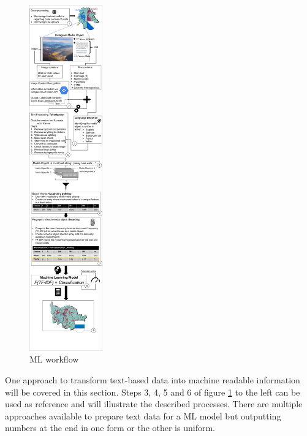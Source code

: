 \begin{figure} %
    \centerline{\includegraphics[trim={0 0 0 0},clip,width=0.28\textwidth]{img/ML_text_data_visualization_cropped.pdf}}
  \caption{ML workflow}
  \label{fig:ml_visualisation}
\end{figure}

One approach to transform text-based data into machine readable information will be covered in this section. Steps 3, 4, 5 and 6 of figure \ref{fig:ml_visualisation} to the left can be used as reference and will illustrate the described processes. There are multiple approaches available to prepare text data for a ML model but outputting numbers at the end in one form or the other is uniform.\\

